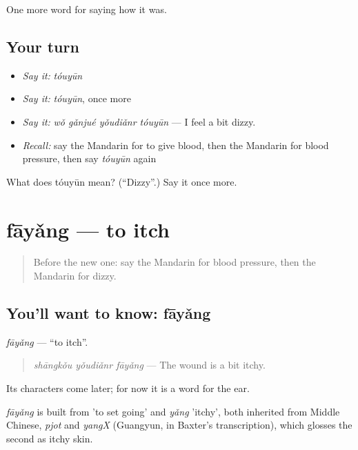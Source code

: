 \begin{grammarlens}[title={What you've built}]
One more word for saying how it was.
\end{grammarlens}

\subsection*{Your turn}
\begin{itemize}
\raggedright
  \item \emph{Say it:} \emph{tóuyūn}
  \item \emph{Say it:} \emph{tóuyūn}, once more
  \item \emph{Say it:} \emph{wǒ gǎnjué yǒudiǎnr tóuyūn} — I feel a bit dizzy.
  \item \emph{Recall:} say the Mandarin for to give blood, then the Mandarin for blood pressure, then say \emph{tóuyūn} again
\end{itemize}

\begin{tcolorbox}[breakable,colback=teal!4,colframe=teal!35!black,title={Before you move on}]
What does tóuyūn mean? (\textquotedblleft{}Dizzy\textquotedblright{}.) Say it once more.
\end{tcolorbox}
\section[fāyǎng]{fāyǎng — to itch}

\label{lesson:ZH-C480-fayang}



\begin{quote}
Before the new one: say the Mandarin for blood pressure, then the Mandarin for dizzy.
\end{quote}

\subsection*{You'll want to know: fāyǎng}
\emph{fāyǎng} — \textquotedblleft{}to itch\textquotedblright{}.

\begin{quote}
\emph{shāngkǒu yǒudiǎnr fāyǎng} — The wound is a bit itchy.
\end{quote}

Its characters come later; for now it is a word for the ear.

\begin{cousinweb}
\emph{fāyǎng} is built from  'to set going' and \emph{yǎng} 'itchy', both inherited from Middle Chinese, \emph{pjot} and \emph{yangX} (Guangyun, in Baxter's transcription), which glosses the second as itchy skin.
\end{cousinweb}

